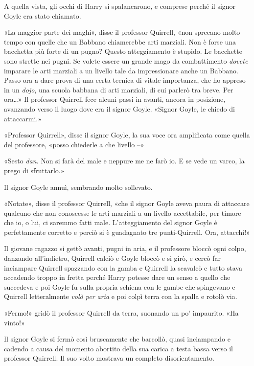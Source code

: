 A quella vista, gli occhi di Harry si spalancarono, e comprese perché il signor Goyle era stato chiamato.

«La maggior parte dei maghi», disse il professor Quirrell, «non sprecano molto tempo con quelle che un Babbano chiamerebbe arti marziali. Non è forse una bacchetta più forte di un pugno? Questo atteggiamento è stupido. Le bacchette sono strette nei pugni. Se volete essere un grande mago da combattimento \textit{dovete} imparare le arti marziali a un livello tale da impressionare anche un Babbano. Passo ora a dare prova di una certa tecnica di vitale importanza, che ho appreso in un \textit{dojo}, una scuola babbana di arti marziali, di cui parlerò tra breve. Per ora…» Il professor Quirrell fece alcuni passi in avanti, ancora in posizione, avanzando verso il luogo dove era il signor Goyle. «Signor Goyle, le chiedo di attaccarmi.»

«Professor Quirrell», disse il signor Goyle, la sua voce ora amplificata come quella del professore, «posso chiederle a che livello –»

«Sesto \textit{dan}. Non si farà del male e neppure me ne farò io. E se vede un varco, la prego di sfruttarlo.»

Il signor Goyle annuì, sembrando molto sollevato.

«Notate», disse il professor Quirrell, «che il signor Goyle aveva paura di attaccare qualcuno che non conoscesse le arti marziali a un livello accettabile, per timore che io, o lui, ci saremmo fatti male. L’atteggiamento del signor Goyle è perfettamente corretto e perciò si è guadagnato tre punti-Quirrell. Ora, attacchi!»

Il giovane ragazzo si gettò avanti, pugni in aria, e il professore bloccò ogni colpo, danzando all’indietro, Quirrell calciò e Goyle bloccò e si girò, e cercò far inciampare Quirrell spazzando con la gamba e Quirrell la scavalcò e tutto stava accadendo troppo in fretta perché Harry potesse dare un senso a quello che succedeva e poi Goyle fu sulla propria schiena con le gambe che spingevano e Quirrell letteralmente \textit{volò per aria} e poi colpì terra con la spalla e rotolò via.

«Fermo!» gridò il professor Quirrell da terra, suonando un po’ impaurito. «Ha vinto!»

Il signor Goyle si fermò così bruscamente che barcollò, quasi inciampando e cadendo a causa del momento abortito della sua carica a testa bassa verso il professor Quirrell. Il suo volto mostrava un completo disorientamento.

